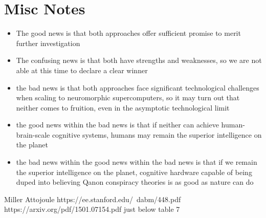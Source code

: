 \documentclass{article}
\begin{document}
\section{Misc Notes}
\begin{itemize}
    \item The good news is that both approaches offer sufficient promise to merit further investigation
    \item The confusing news is that both have strengths and weaknesses, so we are not able at this time to declare a clear winner
    \item the bad news is that both approaches face significant technological challenges when scaling to neuromorphic supercomputers, so it may turn out that neither comes to fruition, even in the asymptotic technological limit
    \item the good news within the bad news is that if neither can achieve human-brain-scale cognitive systems, humans may remain the superior intelligence on the planet
    \item the bad news within the good news within the bad news is that if we remain the superior intelligence on the planet, cognitive hardware capable of being duped into believing Qanon conspiracy theories is as good as nature can do
\end{itemize}




\begin{thebibliography}{}
 Miller Attojoule https://ee.stanford.edu/~dabm/448.pdf
https://arxiv.org/pdf/1501.07154.pdf just below table 7

\end{thebibliography}
\end{document}
